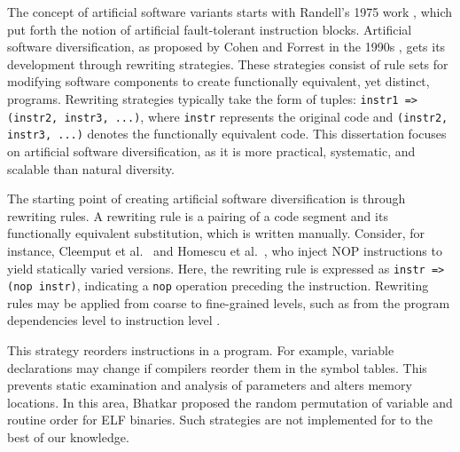 \begin{strategy}
    \label{artificial_diversity}
    The concept of artificial software variants starts with Randell's 1975 work \cite{10.1145/390016.808467}, which put forth the notion of artificial fault-tolerant instruction blocks. 
    Artificial software diversification, as proposed by Cohen and Forrest in the 1990s \cite{cohen1993operating, 595185}, gets its development through rewriting strategies. 
    These strategies consist of rule sets for modifying software components to create functionally equivalent, yet distinct, programs. 
    Rewriting strategies typically take the form of tuples: \texttt{instr1 => (instr2, instr3, ...)}, where \texttt{instr} represents the original code and \texttt{(instr2, instr3, ...)} denotes the functionally equivalent code.
    This dissertation focuses on artificial software diversification, as it is more practical, systematic, and scalable than natural diversity.
\end{strategy}

\begin{strategy}
    \label{rewriting_strategy}
    The starting point of creating artificial software diversification is through rewriting rules.
    A rewriting rule is a pairing of a code segment and its functionally equivalent substitution, which is written manually. 
    Consider, for instance, Cleemput et al.~\cite{Cleemput2012} and Homescu et al.~\cite{homescu2013profile}, who inject NOP instructions to yield statically varied versions. 
    Here, the rewriting rule is expressed as \texttt{instr => (nop instr)}, indicating a \texttt{nop} operation preceding the instruction.
    Rewriting rules may be applied from coarse to fine-grained levels, such as from the program dependencies level \cite{} to instruction level \cite{?}.

\end{strategy}



\begin{strategy}
    \label{instruction_reordering}
    This strategy reorders instructions in a program.
    For example, variable declarations may change if compilers reorder them in the symbol tables. 
    This prevents static examination and analysis of parameters and alters memory locations. 
    In this area, Bhatkar \etal \cite{bhatkar03, bhatkar2005efficient} proposed the random permutation of variable and routine order for ELF binaries.
    Such strategies are not implemented for \Wasm to the best of our knowledge.
\end{strategy}



